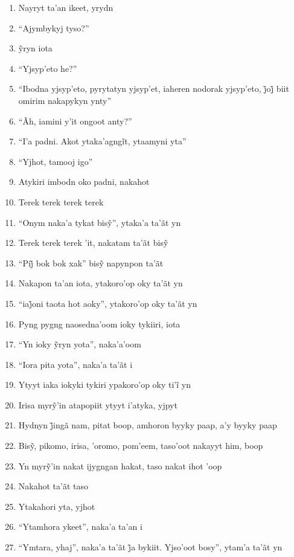 \begin{enumerate}
 \item Nayryt ta'an ikeet, yrydn
 \item ``Ajymbykyj tyso?''
 \item ỹryn iota
 \item ``Yjsyp'eto he?''
 \item ``Ibodna yjsyp’eto, pyrytatyn yjsyp’et, iaheren nodorak yjsyp’eto, j̃oj̃ biit omirim nakapykyn ynty''
 \item ``Ãh, iamini y'it ongoot anty?''
 \item ``I’a padni. Akot ytaka’agngĩt, ytaamyni yta''
 \item ``Yjhot, tamooj igo''
 \item Atykiri imbodn oko padni, nakahot
 \begin{center}\end{center}
 \item Terek terek terek terek
 \item ``Onym naka’a tykat bisỹ'', ytaka’a ta’ãt yn
 \item Terek terek terek ’it, nakatam ta’ãt bisỹ
 \item ``Pij̃ bok bok xak'' bisỹ napynpon ta’ãt
 \item Nakapon ta'an iota, ytakoro'op oky ta'ãt yn
 \item ``iaj̃oni taota hot aoky'', ytakoro’op oky ta’ãt yn
 \item Pyng pygng naosedna'oom ioky tykiiri, iota
 \item ``Yn ioky ỹryn yota'', naka’a’oom
 \item ``Iora pita yota'', naka'a ta'ãt i
 \item Ytyyt iaka iokyki tykiri ypakoro’op oky ti’ĩ yn
 \item Irisa myrỹ’in atapopiit ytyyt i’atyka, yjpyt
 \item Hydnyn j̃ingã nam, pitat boop, amhoron byyky paap, a’y byyky paap
 \item Bisỹ, pikomo, irisa, ’oromo, pom’eem, taso’oot nakayyt him, boop
 \item Yn myrỹ’in nakat ijygngan hakat, taso nakat ihot ’oop
 \item Nakahot ta'ãt taso
 \begin{center}\end{center}
 \item Ytakahori yta, yjhot
 \item ``Ytamhora ykeet'', naka'a ta'an i
 \item ``Ymtara, yhaj'', naka’a ta’ãt j̃a bykiit. Yjso’oot bosy'', ytam’a ta’ãt yn

\end{enumerate}
